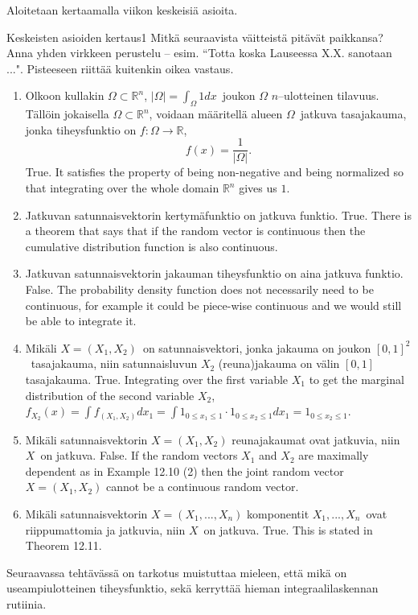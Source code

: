 \documentclass[11pt,a4paper]{amsart}
\newcommand{\R}{\mathbb{R}}
\newcommand{\1}{\mathbf{1}}
\begin{document}
Aloitetaan kertaamalla viikon keskeisiä asioita.
\begin{Exercises}{Keskeisten asioiden kertaus}{1}
Mitkä seuraavista väitteistä pitävät paikkansa? Anna yhden virkkeen perustelu -- esim. ``Totta koska Lauseessa X.X. sanotaan ...". Pisteeseen riittää kuitenkin oikea vastaus. 
\begin{enumerate}
\item Olkoon kullakin $\Omega\subset \R^n$, $|\Omega|=\int_\Omega 1 dx$ joukon $\Omega$ $n$–ulotteinen tilavuus. Tällöin jokaisella $\Omega\subset \R^n$, voidaan määritellä alueen $\Omega$ jatkuva tasajakauma, jonka tiheysfunktio on $f:\Omega\to \R$, 
\[
f(x)=\frac{1}{|\Omega|}.
\]
True. It satisfies the property of being non-negative and being normalized so that integrating over
the whole domain $ \R^{n} $ gives us $ 1$. 
\item Jatkuvan satunnaisvektorin kertymäfunktio on jatkuva funktio.
True. There is a theorem that says that if the random vector is continuous then the cumulative
distribution function is also continuous.
\item Jatkuvan satunnaisvektorin jakauman tiheysfunktio on aina jatkuva funktio. 
False. The probability density function does not necessarily need to be continuous, for example it
could be piece-wise continuous and we would still be able to integrate it.
\item Mikäli $X=(X_1,X_2)$ on satunnaisvektori, jonka jakauma on joukon $[0,1]^2$ tasajakauma, niin satunnaisluvun $X_2$ (reuna)jakauma on välin $[0,1]$ tasajakauma.
True. Integrating over the first variable $ X_{1} $ to get the marginal distribution of the second
variable $ X_{2} $, $ f_{X_2} (x) = \int f_{(X_1, X_2)} dx_1 = \int 1_{0 \leq x_1 \leq 1} \cdot 1_{0
\leq x_{2} \leq 1} dx_1 = 1_{0 \leq x_2 \leq 1}  $.
\item Mikäli satunnaisvektorin $X=(X_1,X_2)$ reunajakaumat ovat jatkuvia, niin $X$ on jatkuva.
False. If the random vectors $ X_1$ and $ X_2$ are maximally dependent as in Example 12.10 (2) then
the joint random vector $ X = (X_1, X_2)$ cannot be a continuous random vector.
\item Mikäli satunnaisvektorin $X=(X_1,...,X_n)$ komponentit $X_1,...,X_n$ ovat riippumattomia ja jatkuvia, niin $X$ on jatkuva.
True. This is stated in Theorem 12.11.
\end{enumerate}
\end{Exercises}

Seuraavassa tehtävässä on tarkotus muistuttaa mieleen, että mikä on useampiulotteinen tiheysfunktio, sekä kerryttää hieman integraalilaskennan rutiinia.
\end{document}
